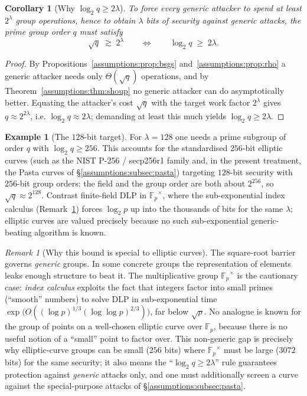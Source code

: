 \documentclass[11pt,a4paper]{article}
\newtheorem{corollary}[theorem]{Corollary}
\theoremstyle{definition}
\newtheorem{example}[theorem]{Example}
\theoremstyle{remark}
\newtheorem{remark}[theorem]{Remark}
\newcommand{\Fp}{\ensuremath{\mathbb{F}_{p}}}
\begin{document}
\begin{corollary}[Why \(\log_2 q \ge 2\lambda\)]
\label{assumptions:cor:bitlength}
To force every generic attacker to spend at least \(2^{\lambda}\) group operations, hence to obtain \(\lambda\) bits of security against generic attacks, the prime group order \(q\) must satisfy
\[
\sqrt q \;\gtrsim\; 2^{\lambda} \qquad\Longleftrightarrow\qquad \log_2 q \;\ge\; 2\lambda .
\]
\end{corollary}

\begin{proof}
By Propositions~\ref{assumptions:prop:bsgs} and~\ref{assumptions:prop:rho} a generic attacker needs only \(\Theta(\sqrt q)\) operations, and by Theorem~\ref{assumptions:thm:shoup} no generic attacker can do asymptotically better. Equating the attacker's cost \(\sqrt q\) with the target work factor \(2^{\lambda}\) gives \(q \approx 2^{2\lambda}\), i.e. \(\log_2 q \approx 2\lambda\); demanding at least this much yields \(\log_2 q \ge 2\lambda\).
\end{proof}

\begin{example}[The \(128\)-bit target]
\label{assumptions:exa:128}
For \(\lambda = 128\) one needs a prime subgroup of order \(q\) with \(\log_2 q \ge 256\). This accounts for the standardised \(256\)-bit elliptic curves (such as the NIST P-256 / secp256r1 family and, in the present treatment, the Pasta curves of \S\ref{assumptions:subsec:pasta}) targeting \(128\)-bit security with \(256\)-bit group orders: the field and the group order are both about \(2^{256}\), so \(\sqrt q \approx 2^{128}\). Contrast finite-field DLP in \(\Fp^\times\), where the sub-exponential index calculus (Remark~\ref{assumptions:rem:index-calculus}) forces \(\log_2 p\) up into the thousands of bits for the same \(\lambda\); elliptic curves are valued precisely because no such sub-exponential generic-beating algorithm is known.
\end{example}

\begin{remark}[Why this bound is special to elliptic curves]
\label{assumptions:rem:index-calculus}
The square-root barrier governs \emph{generic} groups. In some concrete groups the representation of elements leaks enough structure to beat it. The multiplicative group \(\Fp^\times\) is the cautionary case: \emph{index calculus} exploits the fact that integers factor into small primes (``smooth'' numbers) to solve DLP in sub-exponential time \(\exp\!\bigl(O((\log p)^{1/3}(\log\log p)^{2/3})\bigr)\), far below \(\sqrt p\). No analogue is known for the group of points on a well-chosen elliptic curve over \(\Fp\), because there is no useful notion of a ``small'' point to factor over. This non-generic gap is precisely why elliptic-curve groups can be small (\(256\) bits) where \(\Fp^\times\) must be large (\(3072\) bits) for the same security; it also means the ``\(\log_2 q \ge 2\lambda\)'' rule guarantees protection against \emph{generic} attacks only, and one must additionally screen a curve against the special-purpose attacks of \S\ref{assumptions:subsec:pasta}.
\end{remark}
\end{document}
